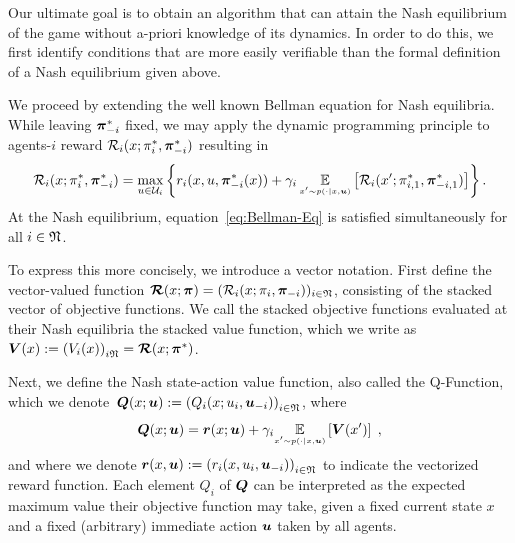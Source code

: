 \documentclass[onefignum,onetabnum]{siamonline171218}
\begin{document}
Our ultimate goal is to obtain an algorithm that can attain the Nash equilibrium of the game without a-priori knowledge of its dynamics. In order to do this, we first identify conditions that are more easily verifiable than the formal definition of a Nash  equilibrium given above.

We proceed by extending the well known Bellman equation for Nash equilibria. While leaving $\bm{\pi}^{\ast}_{-i}$ fixed, we may apply the dynamic programming principle to agents-$i$ reward $\mathcal{R}_i(x;\pi^{\ast}_i,\bm{\pi}^{\ast}_{-i})$ resulting in
\begin{equation} \label{eq:Bellman-Eq}
	\Ri(x;\pist_i,\bpist_{-i})
	=
	\max_{u\in\Ui} \left\{
	r_i(x,u,\bpist_{-i}(x)) + \gamma_i \,  \EE{x^\prime \sim p(\cdot \mid x,\bu)} \left[ \Ri(x^\prime;\pist_{i,1},\bpist_{-i,1}) \right]
	\right\}.
\end{equation}
At the Nash equilibrium, equation~\eqref{eq:Bellman-Eq} is satisfied simultaneously for all $i\in{\mathfrak{N}}$.

To express this more concisely, we introduce a vector notation. First define the vector-valued function $\bm{\mathcal{R}}(x;\bm{\pi})=(\mathcal{R}_i(x;\pi_i,\bm{\pi}_{-i}))_{i\in{\mathfrak{N}}}$, consisting of the stacked vector of objective functions. We call the stacked objective functions evaluated at their Nash equilibria the stacked value function, which we write as $\bm{V}(x):=\left(V_i(x)\right)_{i{\mathfrak{N}}} = \bm{\mathcal{R}}(x;\bm{\pi}^{\ast})$.

Next, we define the Nash state-action value function, also called the Q-Function, which we denote $\,\bm{Q}(x;{\bm{u}}) := \left( Q_i(x;u_i,{\bm{u}}_{-i})\right)_{i\in{\mathfrak{N}}}$, where
\begin{equation}
	\bm{Q}(x;{\bm{u}}) = \bm{r}(x;{\bm{u}}) + \gamma_i  \underset{{\scriptscriptstyle x^\prime \sim p(\cdot \mid x,{\bm{u}})}}{\mathbb{E}} \left[ \bm{V}(x^\prime) \right]
	\;,
\end{equation}
and where we denote $\bm{r}(x,{\bm{u}}):=\left(r_i(x,u_{i},{\bm{u}}_{-i})\right)_{i\in{\mathfrak{N}}}$ to indicate the vectorized reward function.
Each element $Q_i$ of $\bm{Q}$ can be interpreted as the expected maximum value their objective function may take, given a fixed current state $x$ and a fixed (arbitrary) immediate action ${\bm{u}}$ taken by all agents.

\end{document}
